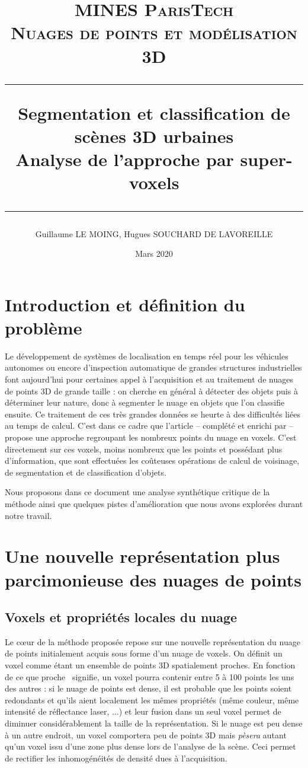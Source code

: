 \documentclass[a4paper, onecolumn, 11pt]{article}
\title{
\normalfont \normalsize
\textsc{MINES ParisTech\\ Nuages de points et modélisation 3D } \\
\vspace{2cm}\hrule\vspace{1cm}
\huge Segmentation et classification de scènes 3D urbaines \\Analyse de l'approche par super-voxels
\vspace{1cm}\hrule\vspace{1cm}
}
\author{Guillaume LE MOING, Hugues SOUCHARD DE LAVOREILLE}
\date{\vspace{12cm} Mars 2020}
\begin{document}
\maketitle

\tableofcontents

\section{Introduction et définition du problème}
Le développement de systèmes de localisation en temps réel pour les véhicules autonomes ou encore d'inspection automatique de grandes structures industrielles font aujourd'hui pour certaines appel à l'acquisition et au traitement de nuages de points 3D de grande taille : on cherche en général à détecter des objets puis à déterminer leur nature, donc à segmenter le nuage en objets que l'on classifie ensuite. Ce traitement de ces très grandes données se heurte à des difficultés liées au temps de calcul. C'est dans ce cadre que l'article \cite{aka_article} – complété et enrichi par \cite{aka_thesis} – propose une approche regroupant les nombreux points du nuage en voxels. C'est directement sur ces voxels, moins nombreux que les points et possédant plus d'information, que sont effectuées les coûteuses opérations de calcul de voisinage, de segmentation et de classification d'objets.

Nous proposons dans ce document une analyse synthétique critique de la méthode ainsi que quelques pistes d'amélioration que nous avons explorées durant notre travail.

\section{Une nouvelle représentation plus parcimonieuse des nuages de points}
\subsection{Voxels et propriétés locales du nuage}
Le cœur de la méthode proposée repose sur une nouvelle représentation du nuage de points initialement acquis sous forme d'un nuage de voxels. On définit un voxel comme étant un ensemble de points 3D spatialement proches. En fonction de ce que \og proche \fg\ signifie, un voxel pourra contenir entre 5 à 100 points les uns des autres : si le nuage de points est dense, il est probable que les points soient redondants et qu'ils aient localement les mêmes propriétés (même couleur, même intensité de réflectance laser, ...) et leur fusion dans un seul voxel permet de diminuer considérablement la taille de la représentation. Si le nuage est peu dense à un autre endroit, un voxel comportera peu de points 3D mais \emph{pèsera} autant qu'un voxel issu d'une zone plus dense lors de l'analyse de la scène. Ceci permet de rectifier les inhomogénéités de densité dues à l'acquisition.
\end{document}
